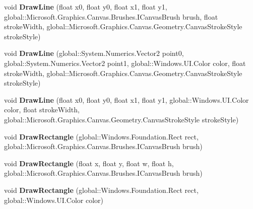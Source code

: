 \begin{DoxyCompactItemize}
void {\bfseries Draw\+Line} (float x0, float y0, float x1, float y1, global\+::\+Microsoft.\+Graphics.\+Canvas.\+Brushes.\+I\+Canvas\+Brush brush, float stroke\+Width, global\+::\+Microsoft.\+Graphics.\+Canvas.\+Geometry.\+Canvas\+Stroke\+Style stroke\+Style)
\item 
\mbox{\label{class_microsoft_1_1_graphics_1_1_canvas_1_1_canvas_drawing_session_a06731477ea3d279eb0c5362a7fe5623c}} 
void {\bfseries Draw\+Line} (global\+::\+System.\+Numerics.\+Vector2 point0, global\+::\+System.\+Numerics.\+Vector2 point1, global\+::\+Windows.\+U\+I.\+Color color, float stroke\+Width, global\+::\+Microsoft.\+Graphics.\+Canvas.\+Geometry.\+Canvas\+Stroke\+Style stroke\+Style)
\item 
\mbox{\label{class_microsoft_1_1_graphics_1_1_canvas_1_1_canvas_drawing_session_a36162e4fcb252a50541a8a090f23bed6}} 
void {\bfseries Draw\+Line} (float x0, float y0, float x1, float y1, global\+::\+Windows.\+U\+I.\+Color color, float stroke\+Width, global\+::\+Microsoft.\+Graphics.\+Canvas.\+Geometry.\+Canvas\+Stroke\+Style stroke\+Style)
\item 
\mbox{\label{class_microsoft_1_1_graphics_1_1_canvas_1_1_canvas_drawing_session_a3c083e838e6629adba295220fa84faef}} 
void {\bfseries Draw\+Rectangle} (global\+::\+Windows.\+Foundation.\+Rect rect, global\+::\+Microsoft.\+Graphics.\+Canvas.\+Brushes.\+I\+Canvas\+Brush brush)
\item 
\mbox{\label{class_microsoft_1_1_graphics_1_1_canvas_1_1_canvas_drawing_session_ad0fff7fdfb1a558ecd40bfa74e0d8baf}} 
void {\bfseries Draw\+Rectangle} (float x, float y, float w, float h, global\+::\+Microsoft.\+Graphics.\+Canvas.\+Brushes.\+I\+Canvas\+Brush brush)
\item 
\mbox{\label{class_microsoft_1_1_graphics_1_1_canvas_1_1_canvas_drawing_session_a2a920d747185a3bcf7ffa588516b9358}} 
void {\bfseries Draw\+Rectangle} (global\+::\+Windows.\+Foundation.\+Rect rect, global\+::\+Windows.\+U\+I.\+Color color)
\item 

\end{DoxyCompactItemize}
